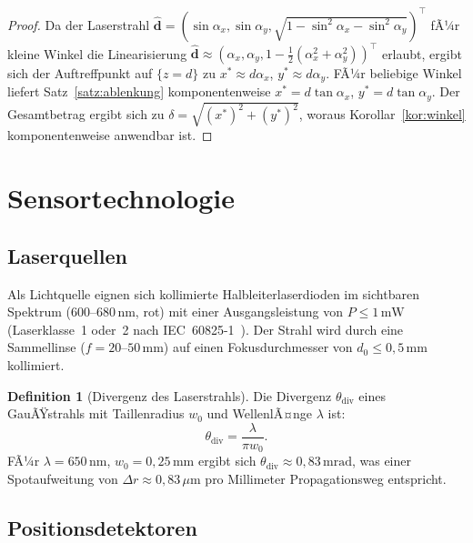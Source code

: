 ﻿\documentclass[a4paper,12pt]{article}
\theoremstyle{definition}
\newtheorem{definition}{Definition}
\begin{document}
\begin{proof}
  Da der Laserstrahl $\hat{\mathbf{d}} = (\sin\alpha_x, \sin\alpha_y, \sqrt{1-\sin^2\alpha_x-\sin^2\alpha_y})^\top$ fÃ¼r kleine Winkel die Linearisierung
  $\hat{\mathbf{d}} \approx (\alpha_x, \alpha_y, 1-\tfrac{1}{2}(\alpha_x^2+\alpha_y^2))^\top$
  erlaubt, ergibt sich der Auftreffpunkt auf $\{z=d\}$ zu
  $x^* \approx d\alpha_x$, $y^* \approx d\alpha_y$.
  FÃ¼r beliebige Winkel liefert Satz~\ref{satz:ablenkung} komponentenweise
  $x^* = d\tan\alpha_x$, $y^* = d\tan\alpha_y$.
  Der Gesamtbetrag ergibt sich zu $\delta = \sqrt{(x^*)^2+(y^*)^2}$,
  woraus Korollar~\ref{kor:winkel} komponentenweise anwendbar ist. \qedhere
\end{proof}

\section{Sensortechnologie}

\subsection{Laserquellen}

Als Lichtquelle eignen sich kollimierte Halbleiterlaserdioden im sichtbaren
Spektrum (600--680\,nm, rot) mit einer Ausgangsleistung von $P \leq 1\,\mathrm{mW}$
(Laserklasse~1 oder~2 nach IEC~60825-1~\cite{iec60825}).
Der Strahl wird durch eine Sammellinse ($f = 20$--$50\,\mathrm{mm}$) auf einen
Fokusdurchmesser von $d_0 \leq 0{,}5\,\mathrm{mm}$ kollimiert.

\begin{definition}[Divergenz des Laserstrahls]
  Die Divergenz $\theta_{\mathrm{div}}$ eines GauÃŸstrahls mit Taillenradius $w_0$
  und WellenlÃ¤nge $\lambda$ ist:
  \[
    \theta_{\mathrm{div}} = \frac{\lambda}{\pi w_0}.
  \]
  FÃ¼r $\lambda = 650\,\mathrm{nm}$, $w_0 = 0{,}25\,\mathrm{mm}$ ergibt sich
  $\theta_{\mathrm{div}} \approx 0{,}83\,\mathrm{mrad}$, was einer Spotaufweitung
  von $\Delta r \approx 0{,}83\,\mu\mathrm{m}$ pro Millimeter Propagationsweg entspricht.
\end{definition}

\subsection{Positionsdetektoren}
\end{document}
